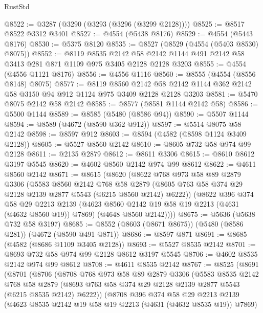 \begin{lexlean}{RustStd}
\begin{coremodule}
@8522 := @3287 (@3290 (@3293 (@3296 (@3299 @2128))))
@8525 := @8517 @8522 @3312 @3401
@8527 := @4554 (@5438 @8176)
@8529 := @4554 (@5443 @8176)
@8530 := @5375 @8120
@8535 := @8527 (@8529 (@4554 (@5403 @8530) @8075))
@8552 := @8119
    @8535
    @2142
    @58
    @2142
    @1144
    @491
    @2142
    @58
    @3413
    @281
    @871
    @1109
    @975
    @3405
    @2128
    @2128
    @3203
@8555 := @4554 (@4556 @1121 @8176)
@8556 := @4556 @1116
@8560 := @8555 (@4554 (@8556 @8148) @8075)
@8577 := @8119
    @8560
    @2142
    @58
    @2142
    @1144
    @362
    @2142
    @58
    @3150
    @94
    @912
    @1124
    @975
    @3409
    @2128
    @2128
    @3203
@8581 := @5470 @8075 @2142 @58 @2142
@8585 := @8577 (@8581 @1144 @2142 @58)
@8586 := @5500 @1144
@8589 := @8585 (@5480 (@8586 @94))
@8590 := @5507 @1144
@8594 := @8589 (@4672 (@8590 @362 @912))
@8597 := @5514 @8075 @58 @2142
@8598 := @8597 @912
@8603 := @8594 (@4582 (@8598 @1124 @3409 @2128))
@8605 := @5527 @8560 @2142
@8610 := @8605 @732 @58 @974 @99 @2128
@8611 := @2135 @2879
@8612 := @8611 @3306
@8615 := @8610 @8612 @3197 @5545
@8620 := @4602 @8560 @2142 @974 @99 @8612
@8622 := @4611 @8560 @2142
@8671 := @8615
    (@8620
      (@8622
        @768
        @973
        @58
        @89
        @2879
        @3306
        (@5583
          @8560
          @2142
          @768
          @58
          @2879
          (@8605 @763 @58 @374 @29 @2128 @2139 @2877 @5543 (@6215 @8560 @2142) @6222))
        (@8622
          @396
          @374
          @58
          @29
          @2213
          @2139
          (@4623 @8560 @2142 @19 @58 @19 @2213 (@4631 (@4632 @8560 @19)) @7869)
          (@4648 @8560 @2142))))
@8675 := @5636 (@5638 @732 @58 @3197)
@8685 := @8552 (@8603 (@8671 @8675)) (@5480 (@8586 @281)) (@4672 (@8590 @491 @871))
@8686 := @8597 @871
@8691 := @8685 (@4582 (@8686 @1109 @3405 @2128))
@8693 := @5527 @8535 @2142
@8701 := @8693 @732 @58 @974 @99 @2128 @8612 @3197 @5545
@8706 := @4602 @8535 @2142 @974 @99 @8612
@8708 := @4611 @8535 @2142
@8767 := @8525
    (@8691
      (@8701
        (@8706
          (@8708
            @768
            @973
            @58
            @89
            @2879
            @3306
            (@5583
              @8535
              @2142
              @768
              @58
              @2879
              (@8693 @763 @58 @374 @29 @2128 @2139 @2877 @5543 (@6215 @8535 @2142) @6222))
            (@8708
              @396
              @374
              @58
              @29
              @2213
              @2139
              (@4623 @8535 @2142 @19 @58 @19 @2213 (@4631 (@4632 @8535 @19)) @7869)

\end{coremodule}
\end{lexlean}
